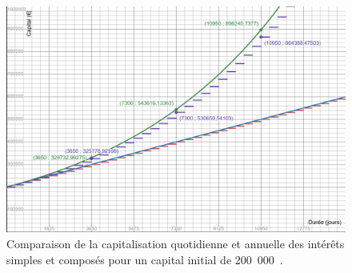 \documentclass{article}
\begin{document}
\begin{enumerate}[label=\textbf{R2.\arabic*}]
                \begin{figure}[h!]
                    \centering
                    \includegraphics[width=\textwidth]{assets/img/compound_interets_200k.png}
                    \caption{Comparaison de la capitalisation quotidienne et annuelle des intérêts simples et composés pour un capital initial de 200\ 000\ .}
                    \label{fig:compound_interets_200k}
                \end{figure}
            \end{enumerate}

                
\end{document}
